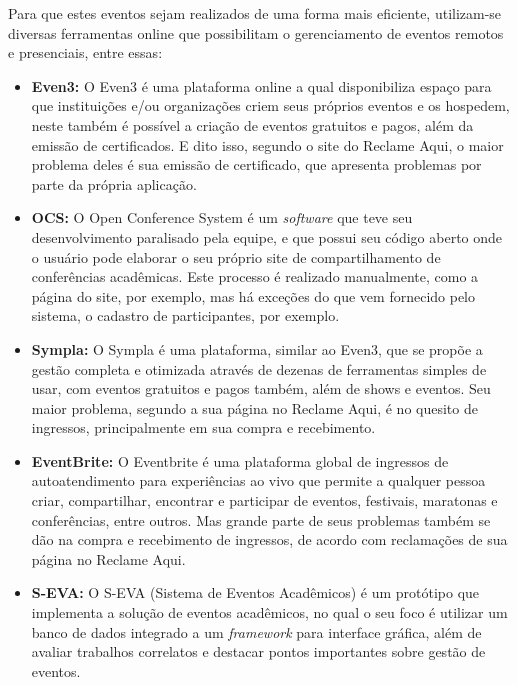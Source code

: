 Para que estes eventos sejam realizados de uma forma mais eficiente, utilizam-se diversas ferramentas online que possibilitam o gerenciamento de eventos remotos e presenciais, entre essas:
\begin{itemize}
    \item \textbf{Even3: }O Even3 é uma plataforma online a qual disponibiliza espaço para que instituições e/ou organizações criem seus próprios eventos e os hospedem, neste também é possível a criação de eventos gratuitos e pagos, além da emissão de certificados. E dito isso, segundo o site do Reclame Aqui, o maior problema deles é sua emissão de certificado, que apresenta problemas por parte da própria aplicação.
    \item \textbf{OCS:} O Open Conference System é um \textit{software} que teve seu desenvolvimento paralisado pela equipe, e que possui seu código aberto onde o usuário pode elaborar o seu próprio site de compartilhamento de conferências acadêmicas. Este processo é realizado manualmente, como a página do site, por exemplo, mas há exceções do que vem fornecido pelo sistema, o cadastro de participantes, por exemplo.
    \item \textbf{Sympla: }O Sympla é uma plataforma, similar ao Even3, que se propõe a gestão completa e otimizada através de dezenas de ferramentas simples de usar, com eventos gratuitos e pagos também, além de shows e eventos. Seu maior problema, segundo a sua página no Reclame Aqui, é no quesito de ingressos, principalmente em sua compra e recebimento.
    \item \textbf{EventBrite: }O Eventbrite é uma plataforma global de ingressos de autoatendimento para experiências ao vivo que permite a qualquer pessoa criar, compartilhar, encontrar e participar de eventos, festivais, maratonas e conferências, entre outros. Mas grande parte de seus problemas também se dão na compra e recebimento de ingressos, de acordo com reclamações de sua página no Reclame Aqui.
    \item \textbf{S-EVA: }O S-EVA (Sistema de Eventos Acadêmicos) é um protótipo que implementa a solução de eventos acadêmicos, no qual o seu foco é utilizar um banco de dados integrado a um \textit{framework} para interface gráfica, além de avaliar trabalhos correlatos e destacar pontos importantes sobre gestão de eventos.
\end{itemize}


